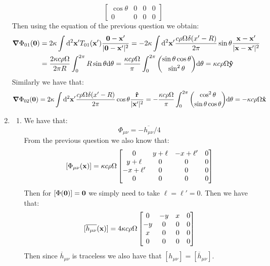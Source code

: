 \documentclass[10pt,a4paper]{article}
\begin{document}
\begin{enumerate}
\[\begin{bmatrix}
\cos\theta & 0 & 0 & 0\\
0 & 0 &0 &0 
\end{bmatrix}
\]
Then using the equation of the previous question we obtain:
\begin{align*}
\grad \Phi_{0 1}(\vb{0}) &= 2 \kappa \int \dd^2 \vb{x'} T_{0 1}(\vb{x'}) \frac{\vb{0} - \vb{x'}}{|\vb{0} - \vb{x'}|^2} = -2 \kappa \int \dd^2 \vb{x'} \frac{c \rho \Omega \delta(x' - R)}{2 \pi} \sin \theta \frac{\vb{x} - \vb{x'}}{|\vb{x} - \vb{x'}|^2}\\
&= \frac{2 \kappa c \rho \Omega}{2\pi R} \int_0^{2\pi} R \sin \theta \dd \theta = \frac{\kappa c \rho \Omega}{\pi} \int_0^{2\pi} \binom{\sin \theta \cos \theta}{\sin^2\theta} \dd \theta = \kappa c \rho \Omega \vu{y}
\end{align*}
Similarly we have that:
\begin{align*}
\grad \Phi_{02}(\vb{0}) = 2 \kappa \int \dd^2 \vb{x'} \frac{c \rho \Omega \delta(x' - R)}{2 \pi} \cos \theta \frac{\vu{r}}{|\vb{x'}|^2}= -\frac{\kappa c \rho \Omega}{\pi} \int_{0}^{2\pi} \binom{\cos^2\theta}{\sin\theta\cos\theta} \dd \theta = - \kappa c \rho \Omega \vu{x}
\end{align*}

\item \begin{enumerate}

\item We have that:
\[
\Phi_{\mu\nu} = - \overline{h_{\mu\nu}}/4 
\]
From the previous question we also know that:
\[
[\Phi_{\mu\nu}(\vb{x})] = \kappa c \rho \Omega \begin{bmatrix}
0 & y + \ell & - x + \ell' & 0\\
y + \ell & 0 & 0 & 0\\
-x + \ell' & 0 & 0 & 0\\
0 & 0 & 0 & 0
\end{bmatrix}
\]
Then for $[\Phi(\vb{0})] = \vb{0}$ we simply need to take $\ell = \ell' = 0$. Then we have that:
\[
[\overline{h_{\mu\nu}}(\vb{x})] = 4\kappa c \rho \Omega \begin{bmatrix}
0 & - y & x & 0\\
-y & 0 & 0 & 0\\
x & 0 & 0& 0\\
0& 0 & 0& 0
\end{bmatrix}
\]
Then since $\overline{h}_{\mu\nu}$ is traceless we also have that $[h_{\mu\nu}] = [\overline{h}_{\mu\nu}]$. 


\end{enumerate}
\end{enumerate}
\end{document}
